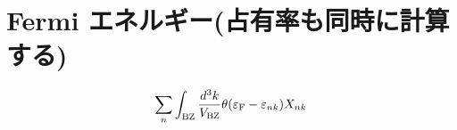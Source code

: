 \documentclass[letterpaper,10pt,dvipdfmx,openany]{sphinxmanual}
\begin{document}
\section{Fermi エネルギー(占有率も同時に計算する)}
\label{\detokenize{routine:fermi}}\begin{equation*}
\begin{split}\begin{align}
\sum_{n}
\int_{\rm BZ} \frac{d^3 k}{V_{\rm BZ}}
\theta(\varepsilon_{\rm F} -
\varepsilon_{n k}) X_{n k}
\end{align}\end{split}
\end{equation*}
\begin{sphinxVerbatim}[commandchars=\\\{\}]
\end{sphinxVerbatim}
\end{document}
